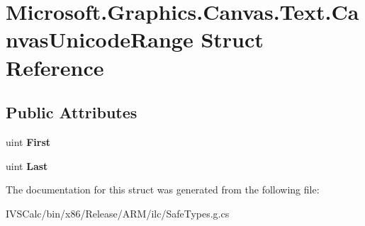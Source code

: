 \hypertarget{struct_microsoft_1_1_graphics_1_1_canvas_1_1_text_1_1_canvas_unicode_range}{}\section{Microsoft.\+Graphics.\+Canvas.\+Text.\+Canvas\+Unicode\+Range Struct Reference}
\label{struct_microsoft_1_1_graphics_1_1_canvas_1_1_text_1_1_canvas_unicode_range}
\subsection*{Public Attributes}
\begin{DoxyCompactItemize}
\item 
\mbox{\label{struct_microsoft_1_1_graphics_1_1_canvas_1_1_text_1_1_canvas_unicode_range_a6139dbe3221478c328a60582821996d9}} 
uint {\bfseries First}
\item 
\mbox{\label{struct_microsoft_1_1_graphics_1_1_canvas_1_1_text_1_1_canvas_unicode_range_a26498cc06d863b8bd794632eaf31f6bd}} 
uint {\bfseries Last}
\end{DoxyCompactItemize}


The documentation for this struct was generated from the following file\+:\begin{DoxyCompactItemize}
\item 
I\+V\+S\+Calc/bin/x86/\+Release/\+A\+R\+M/ilc/Safe\+Types.\+g.\+cs\end{DoxyCompactItemize}
